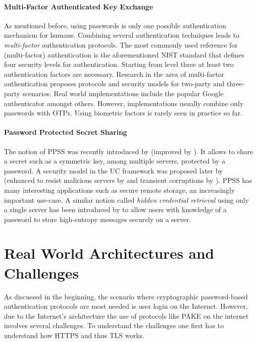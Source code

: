 \paragraph{Multi-Factor Authenticated Key Exchange}
As mentioned before, using passwords is only one possible authentication mechanism for humans.
Combining several authentication techniques leads to \emph{multi-factor} authentication protocols.
The most commonly used reference for (multi-factor) authentication is the aforementioned \ac{NIST} standard \cite{Burr11} that defines four security levels for authentication.
Starting from level three at least two authentication factors are necessary.
Research in the area of multi-factor authentication \cite{PointchevalZ08,SUC10,LiuWM10,HaoC12} proposes protocols and security models for two-party and three-party scenarios.
Real world implementations include the popular Google authenticator \cite{GAuthenticator} amongst others.
However, implementations usually combine only passwords with \acp{OTP}.
Using biometric factors is rarely seen in practice so far.

\paragraph{Password Protected Secret Sharing}
The notion of \acl{PPSS} was recently introduced by \citet{Bagherzandi2011} (improved by \citet{JareckiKK14}).
It allows to share a secret such as a symmetric key, among multiple servers, protected by a password. 
A security model in the \ac{UC} framework was proposed later by \citet{Camenisch2012} (enhanced to resist malicious servers by \citet{CamenischLLN14} and transient corruptions by \citet{CamenischEN15}).
\ac{PPSS} has many interesting applications such as secure remote storage, an increasingly important use-case.
A similar notion called \emph{hidden credential retrieval} using only a single server has been introduced by \citet{Boyen09} to allow users with knowledge of a password to store high-entropy messages securely on a server.


\section{Real World Architectures and Challenges}\label{sec:intro:real-world}
As discussed in the beginning, the scenario where cryptographic password-based authentication protocols are most needed is user login on the Internet.
However, due to the Internet's architecture the use of protocols like \ac{PAKE} on the internet involves several challenges.
To understand the challenges one first has to understand how \ac{HTTPS} and thus \ac{TLS} works.

